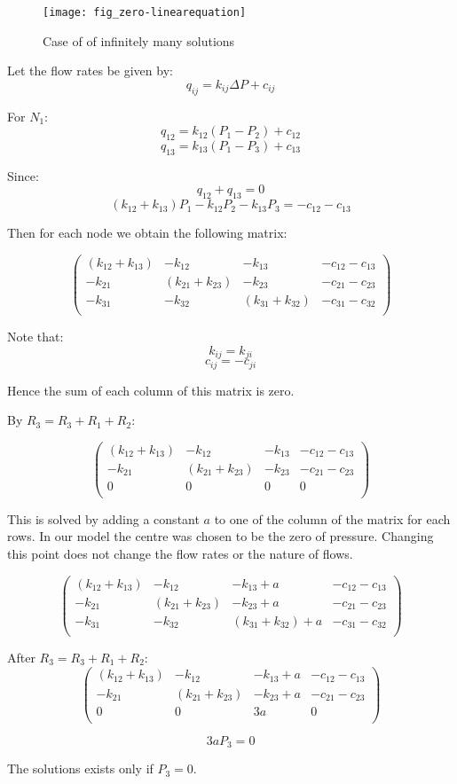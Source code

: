 	\begin{figure}[H]
		\texttt{[image: fig\_zero-linearequation]}
		\caption{Case of of infinitely many solutions}
	\end{figure}
	
	Let the flow rates be given by:
	\begin{equation}
		q_{ij} = k_{ij} \Delta P + c_{ij}
	\end{equation}
	
	For $N_{1}$:
	\[ q_{12} = k_{12}(P_1 - P_2) + c_{12} \]
	\[ q_{13} = k_{13}(P_1 - P_3) + c_{13} \]
	
	Since:
	\[ q_{12} + q_{13} = 0 \]
	\[(k_{12} + k_{13})P_1 - k_{12}P_2 - k_{13}P_3 = -c_{12} - c_{13} \]
	
	Then for each node we obtain the following matrix:
	
	\[ 
	\begin{pmatrix}
		(k_{12} + k_{13}) & -k_{12} & -k_{13} & -c_{12} - c_{13} \\
		-k_{21} & (k_{21} + k_{23}) & -k_{23} & -c_{21} - c_{23} \\
		-k_{31} & -k_{32} & (k_{31} + k_{32}) & -c_{31} - c_{32} \\
	\end{pmatrix}
	\]
	
	Note that:
	\[ k_{ij} = k_{ji} \]
	\[ c_{ij} = -c_{ji} \]
	
	Hence the sum of each column of this matrix is zero.
	
	By $R_3 = R_3 + R_1 + R_2$:
	
	\[ 
	\begin{pmatrix}
		(k_{12} + k_{13}) & -k_{12} & -k_{13} & -c_{12} - c_{13} \\
		-k_{21} & (k_{21} + k_{23}) & -k_{23} & -c_{21} - c_{23} \\
		0 & 0 & 0 & 0 \\
	\end{pmatrix}
	\]
	
	This is solved by adding a constant $a$ to one of the column of the matrix for each rows. In our model the centre was chosen to be the zero of pressure. Changing this point does not change the flow rates or the nature of flows.
	
	\[ 
	\begin{pmatrix}
		(k_{12} + k_{13}) & -k_{12} & -k_{13} + a & -c_{12} - c_{13} \\
		-k_{21} & (k_{21} + k_{23}) & -k_{23} + a & -c_{21} - c_{23} \\
		-k_{31} & -k_{32} & (k_{31} + k_{32}) + a & -c_{31} - c_{32} \\
	\end{pmatrix}
	\]
	
	After $R_3 = R_3 + R_1 + R_2$:
	\[ 
	\begin{pmatrix}
		(k_{12} + k_{13}) & -k_{12} & -k_{13} + a & -c_{12} - c_{13} \\
		-k_{21} & (k_{21} + k_{23}) & -k_{23} + a & -c_{21} - c_{23} \\
		0 & 0 & 3a & 0 \\
	\end{pmatrix}
	\]
	
	\[3aP_3 = 0 \]
	
	The solutions exists only if $P_3 = 0$.
	




 
	
